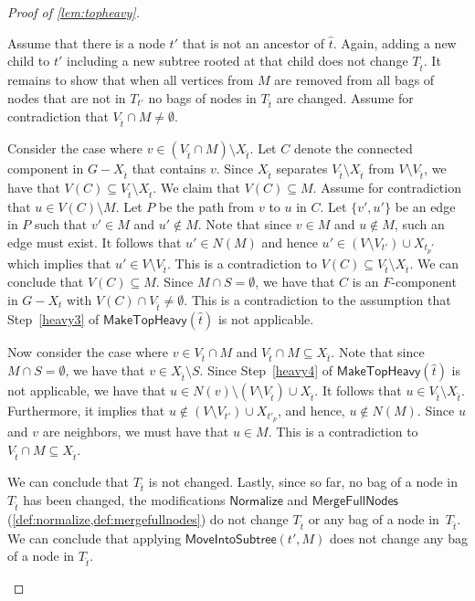 \documentclass[a4paper,UKenglish,cleveref, autoref, thm-restate, numberwithinsect]{lipics-v2021}
\newcounter{modification}
\newcommand{\Normalize}{\mathsf{Normalize}}
\newcommand{\MoveIntoSubtree}{\mathsf{MoveIntoSubtree}}
\newcommand{\MergeFullNodes}{\mathsf{MergeFullNodes}}
\newcommand{\MakeTopHeavy}{\mathsf{MakeTopHeavy}}
\begin{document}
\begin{proof}[Proof of \cref{lem:topheavy}]
\begin{claimproof}
Assume that there is a node $t'$ that is not an ancestor of $\hat{t}$.
Again, adding a new child to $t'$ including a new subtree rooted at that child does not change $T_{\hat{t}}$. It remains to show that when all vertices from $M$ are removed from all bags of nodes that are not in $T_{t'}$ no bags of nodes in $T_{\hat{t}}$ are changed. Assume for contradiction that $V_{\hat{t}} \cap M\neq \emptyset$. 

Consider the case where $v\in (V_{\hat{t}} \cap M)\setminus X_{\hat{t}}$. Let $C$ denote the connected component in $G-X_{\hat{t}}$ that contains $v$. Since $X_{\hat{t}}$ separates $V_{\hat{t}}\setminus X_{\hat{t}}$ from $V\setminus V_{\hat{t}}$, we have that $V(C)\subseteq V_{\hat{t}}\setminus X_{\hat{t}}$.
We claim that $V(C)\subseteq M$. Assume for contradiction that $u\in V(C)\setminus M$. Let $P$ be the path from $v$ to $u$ in $C$. Let $\{v',u'\}$ be an edge in $P$ such that $v'\in M$ and $u'\notin M$. Note that since $v\in M$ and $u\notin M$, such an edge must exist. It follows that $u'\in N(M)$ and hence $u'\in (V\setminus V_{t'})\cup X_{t_p'}$ which implies that $u'\in V\setminus V_{\hat{t}}$. This is a contradiction to $V(C)\subseteq V_{\hat{t}}\setminus X_{\hat{t}}$. We can conclude that $V(C)\subseteq M$. Since $M\cap S=\emptyset$, we have that $C$ is an $F$-component in $G-X_t$ with $V(C)\cap V_{\hat{t}}\neq\emptyset$. This is a contradiction to the assumption that Step~\ref{heavy3} of $\MakeTopHeavy({\hat{t}})$ is not applicable. 

Now consider the case where $v\in V_{\hat{t}} \cap M$ and $V_{\hat{t}} \cap M\subseteq X_{\hat{t}}$. Note that since $M\cap S=\emptyset$, we have that $v\in X_{\hat{t}}\setminus S$. Since Step~\ref{heavy4} of $\MakeTopHeavy({\hat{t}})$ is not applicable, we have that $u\in N(v)\setminus (V\setminus V_{\hat{t}})\cup X_{\hat{t}}$. It follows that $u\in V_{\hat{t}}\setminus X_{\hat{t}}$. Furthermore, it implies that $u\notin (V\setminus V_{t'})\cup X_{t'_p}$, and hence, $u\notin N(M)$. Since $u$ and $v$ are neighbors, we must have that $u\in M$. This is a contradiction to $V_{\hat{t}} \cap M\subseteq X_{\hat{t}}$.

We can conclude that $T_{\hat{t}}$ is not changed. Lastly, since so far, no bag of a node in~$T_{\hat{t}}$ has been changed, the modifications $\Normalize$ and $\MergeFullNodes$ (\cref{def:normalize,def:mergefullnodes}) do not change $T_{\hat{t}}$ or any bag of a node in~$T_{\hat{t}}$. We can conclude that applying $\MoveIntoSubtree(t', M)$ does not change any bag of a node in $T_{\hat{t}}$.








\end{claimproof}
\end{proof}
\end{document}
